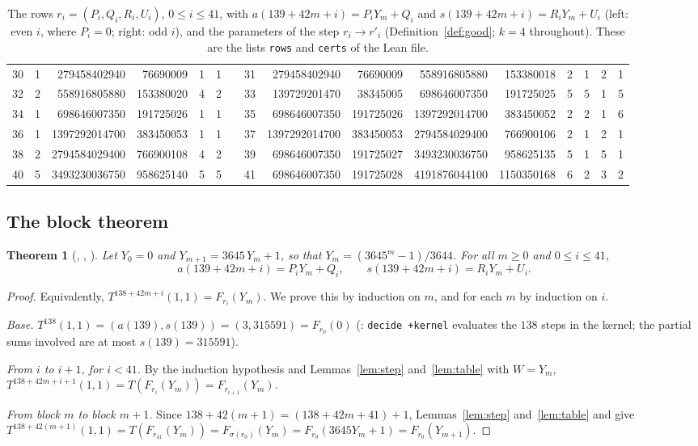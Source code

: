 \documentclass[11pt]{amsart}
\theoremstyle{plain}
\newtheorem{theorem}{Theorem}
\theoremstyle{definition}
\begin{document}
\begin{table}[t]
\begin{tabular}{rrrrrrcrrrrrrrrr}
30 & 1 & 279458402940 & 76690009 & 1 & 1 && 31 & 279458402940 & 76690009 & 558916805880 & 153380018 & 2 & 1 & 2 & 1 \\
32 & 2 & 558916805880 & 153380020 & 4 & 2 && 33 & 139729201470 & 38345005 & 698646007350 & 191725025 & 5 & 5 & 1 & 5 \\
34 & 1 & 698646007350 & 191725026 & 1 & 1 && 35 & 698646007350 & 191725026 & 1397292014700 & 383450052 & 2 & 2 & 1 & 6 \\
36 & 1 & 1397292014700 & 383450053 & 1 & 1 && 37 & 1397292014700 & 383450053 & 2794584029400 & 766900106 & 2 & 1 & 2 & 1 \\
38 & 2 & 2794584029400 & 766900108 & 4 & 2 && 39 & 698646007350 & 191725027 & 3493230036750 & 958625135 & 5 & 1 & 5 & 1 \\
40 & 5 & 3493230036750 & 958625140 & 5 & 5 && 41 & 698646007350 & 191725028 & 4191876044100 & 1150350168 & 6 & 2 & 3 & 2 \\
\end{tabular}
\caption{The rows $r_i=(P_i,Q_i,R_i,U_i)$, $0\le i\le 41$, with $a(139+42m+i)=P_iY_m+Q_i$ and $s(139+42m+i)=R_iY_m+U_i$ (left: even $i$, where $P_i=0$; right: odd $i$), and the parameters of the step $r_i\to r'_i$ (Definition~\ref{def:good}; $k=4$ throughout). These are the lists \texttt{rows} and \texttt{certs} of the Lean file.}\label{tab:rows}
\end{table}

\subsection{The block theorem}

\begin{theorem}[, , ]\label{thm:block}
Let $Y_0=0$ and $Y_{m+1}=3645\,Y_m+1$, so that $Y_m=(3645^m-1)/3644$. For all $m\ge0$ and $0\le i\le41$,
\[
  a(139+42m+i)=P_iY_m+Q_i,\qquad s(139+42m+i)=R_iY_m+U_i .
\]
\end{theorem}

\begin{proof}
Equivalently, $T^{138+42m+i}(1,1)=F_{r_i}(Y_m)$. We prove this by induction on $m$, and for each $m$ by induction on $i$.

\emph{Base.} $T^{138}(1,1)=(a(139),s(139))=(3,315591)=F_{r_0}(0)$ (: \texttt{decide +kernel} evaluates the $138$ steps in the kernel; the partial sums involved are at most $s(139)=315591$).

\emph{From $i$ to $i+1$, for $i<41$.} By the induction hypothesis and Lemmas~\ref{lem:step} and~\ref{lem:table} with $W=Y_m$,
$T^{138+42m+i+1}(1,1)=T(F_{r_i}(Y_m))=F_{r_{i+1}}(Y_m)$.

\emph{From block $m$ to block $m+1$.} Since $138+42(m+1)=(138+42m+41)+1$, Lemmas~\ref{lem:step} and~\ref{lem:table} and  give $T^{138+42(m+1)}(1,1)=T(F_{r_{41}}(Y_m))=F_{\sigma(r_0)}(Y_m)=F_{r_0}(3645Y_m+1)=F_{r_0}(Y_{m+1})$.
\end{proof}
\end{document}
